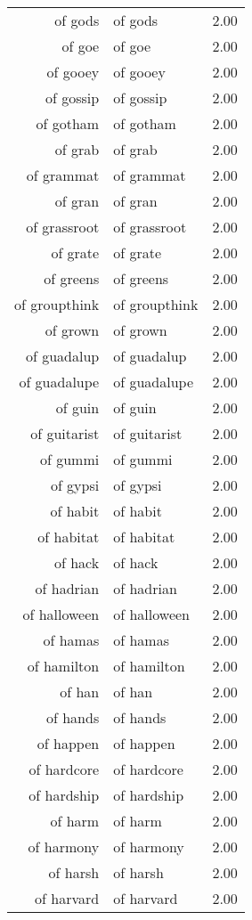 \begin{table}[ht]
\begin{tabular}{rlr}
  of gods & of gods & 2.00 \\ 
  of goe & of goe & 2.00 \\ 
  of gooey & of gooey & 2.00 \\ 
  of gossip & of gossip & 2.00 \\ 
  of gotham & of gotham & 2.00 \\ 
  of grab & of grab & 2.00 \\ 
  of grammat & of grammat & 2.00 \\ 
  of gran & of gran & 2.00 \\ 
  of grassroot & of grassroot & 2.00 \\ 
  of grate & of grate & 2.00 \\ 
  of greens & of greens & 2.00 \\ 
  of groupthink & of groupthink & 2.00 \\ 
  of grown & of grown & 2.00 \\ 
  of guadalup & of guadalup & 2.00 \\ 
  of guadalupe & of guadalupe & 2.00 \\ 
  of guin & of guin & 2.00 \\ 
  of guitarist & of guitarist & 2.00 \\ 
  of gummi & of gummi & 2.00 \\ 
  of gypsi & of gypsi & 2.00 \\ 
  of habit & of habit & 2.00 \\ 
  of habitat & of habitat & 2.00 \\ 
  of hack & of hack & 2.00 \\ 
  of hadrian & of hadrian & 2.00 \\ 
  of halloween & of halloween & 2.00 \\ 
  of hamas & of hamas & 2.00 \\ 
  of hamilton & of hamilton & 2.00 \\ 
  of han & of han & 2.00 \\ 
  of hands & of hands & 2.00 \\ 
  of happen & of happen & 2.00 \\ 
  of hardcore & of hardcore & 2.00 \\ 
  of hardship & of hardship & 2.00 \\ 
  of harm & of harm & 2.00 \\ 
  of harmony & of harmony & 2.00 \\ 
  of harsh & of harsh & 2.00 \\ 
  of harvard & of harvard & 2.00 \\ 

\end{tabular}
\end{table}
